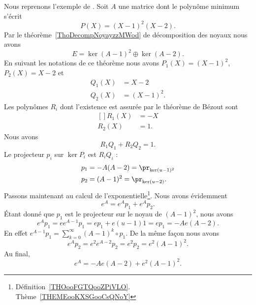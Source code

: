 Nous reprenons l'exemple de \cite{MneimneReduct}. Soit \( A\) une matrice dont le polynôme minimum s'écrit
\begin{equation}
    P(X)=(X-1)^2(X-2).
\end{equation}
Par le théorème~\ref{ThoDecompNoyayzzMWod} de décomposition des noyaux nous avons
\begin{equation}
    E=\ker(A-1)^2\oplus\ker(A-2).
\end{equation}
En suivant les notations de ce théorème nous avons \( P_1(X)=(X-1)^2\), \( P_2(X)=X-2\) et
\begin{subequations}
    \begin{align}
        Q_1(X)&=X-2\\
        Q_2(X)&=(X-1)^2.
    \end{align}
\end{subequations}
Les polynômes \( R_i\) dont l'existence est assurée par le théorème de Bézout sont
\begin{equation}
    \begin{aligned}[]
        R_1(X)&=-X\\
        R_2(X)&=1.
    \end{aligned}
\end{equation}
Nous avons
\begin{equation}
    R_1Q_1+R_2Q_2=1.
\end{equation}
Le projecteur \( p_i\) sur \( \ker P_i\) est \( R_iQ_i\) :
\begin{equation}
    \begin{aligned}[]
        p_1&=-A(A-2)=\pr_{\ker(u-1)^2}\\
        p_2&=(A-1)^2=\pr_{\ker(u-2)}.
    \end{aligned}
\end{equation}
Passons maintenant au calcul de l'exponentielle\footnote{Définition~\ref{THOooFGTQooZPiVLO}. Thème~\ref{THEMEooKXSGooCsQNoY}}. Nous avons évidemment
\begin{equation}
    e^A=e^Ap_1+e^Ap_2.
\end{equation}
Étant donné que \( p_1\) est le projecteur sur le noyau de \( (A-1)^2\), nous avons
\begin{equation}
    e^Ap_1=ee^{A-1}p_1=ep_1+e(u-1)1=ep_1=-Ae(A-2).
\end{equation}
En effet \( e^{A-1}p_1=\sum_{k=0}^{\infty}(A-1)^k\circ p_1\). De la même façon nous avons
\begin{equation}
    e^Ap_2=e^2e^{A-2}p_2=e^2p_2=e^2(A-1)^2.
\end{equation}
Au final,
\begin{equation}
    e^A=-Ae(A-2)+e^2(A-1)^2.
\end{equation}

